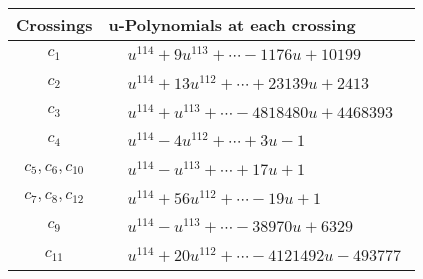 \documentclass[1p]{elsarticle_modified}
\theoremstyle{definition}
\begin{document}
\begin{tabular}{m{50pt}|m{274pt}}
Crossings & \hspace{64pt}u-Polynomials at each crossing \\
\hline $$\begin{aligned}c_{1}\end{aligned}$$&$\begin{aligned}
&u^{114}+9 u^{113}+\cdots-1176 u+10199
\end{aligned}$\\
\hline $$\begin{aligned}c_{2}\end{aligned}$$&$\begin{aligned}
&u^{114}+13 u^{112}+\cdots+23139 u+2413
\end{aligned}$\\
\hline $$\begin{aligned}c_{3}\end{aligned}$$&$\begin{aligned}
&u^{114}+u^{113}+\cdots-4818480 u+4468393
\end{aligned}$\\
\hline $$\begin{aligned}c_{4}\end{aligned}$$&$\begin{aligned}
&u^{114}-4 u^{112}+\cdots+3 u-1
\end{aligned}$\\
\hline $$\begin{aligned}c_{5},c_{6},c_{10}\end{aligned}$$&$\begin{aligned}
&u^{114}- u^{113}+\cdots+17 u+1
\end{aligned}$\\
\hline $$\begin{aligned}c_{7},c_{8},c_{12}\end{aligned}$$&$\begin{aligned}
&u^{114}+56 u^{112}+\cdots-19 u+1
\end{aligned}$\\
\hline $$\begin{aligned}c_{9}\end{aligned}$$&$\begin{aligned}
&u^{114}- u^{113}+\cdots-38970 u+6329
\end{aligned}$\\
\hline $$\begin{aligned}c_{11}\end{aligned}$$&$\begin{aligned}
&u^{114}+20 u^{112}+\cdots-4121492 u-493777
\end{aligned}$\\
\hline
\end{tabular}\\~\\
\end{document}
